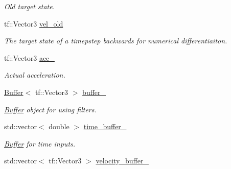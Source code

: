 \begin{DoxyCompactItemize}
\begin{DoxyCompactList}\small\item\em Old target state. \end{DoxyCompactList}\item 
tf\+::\+Vector3 \hyperlink{classController_af857eab2b9db0c337681acd6be5c6fd4}{vel\+\_\+old}\hypertarget{classController_af857eab2b9db0c337681acd6be5c6fd4}{}\label{classController_af857eab2b9db0c337681acd6be5c6fd4}

\begin{DoxyCompactList}\small\item\em The target state of a timepstep backwards for numerical differentiaiton. \end{DoxyCompactList}\item 
tf\+::\+Vector3 \hyperlink{classController_a9ccb2e10f9ed3ae1da1e7dbc080e5e9e}{acc\+\_\+}\hypertarget{classController_a9ccb2e10f9ed3ae1da1e7dbc080e5e9e}{}\label{classController_a9ccb2e10f9ed3ae1da1e7dbc080e5e9e}

\begin{DoxyCompactList}\small\item\em Actual acceleration. \end{DoxyCompactList}\item 
\hyperlink{structController_1_1Buffer}{Buffer}$<$ tf\+::\+Vector3 $>$ \hyperlink{classController_a083a491c9125ddd99270d9b2101e6de3}{buffer\+\_\+}\hypertarget{classController_a083a491c9125ddd99270d9b2101e6de3}{}\label{classController_a083a491c9125ddd99270d9b2101e6de3}

\begin{DoxyCompactList}\small\item\em \hyperlink{structController_1_1Buffer}{Buffer} object for using filters. \end{DoxyCompactList}\item 
std\+::vector$<$ double $>$ \hyperlink{classController_a41679248f2691ac40f8865c2137c5a32}{time\+\_\+buffer\+\_\+}\hypertarget{classController_a41679248f2691ac40f8865c2137c5a32}{}\label{classController_a41679248f2691ac40f8865c2137c5a32}

\begin{DoxyCompactList}\small\item\em \hyperlink{structController_1_1Buffer}{Buffer} for time inputs. \end{DoxyCompactList}\item 
std\+::vector$<$ tf\+::\+Vector3 $>$ \hyperlink{classController_a08513e7d1801a986d4ae826b5f904f57}{velocity\+\_\+buffer\+\_\+}\hypertarget{classController_a08513e7d1801a986d4ae826b5f904f57}{}\label{classController_a08513e7d1801a986d4ae826b5f904f57}


\end{DoxyCompactItemize}
